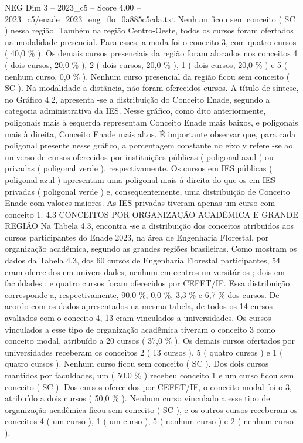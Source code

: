 \begin{textsample}{NEG Dim 3 – 2023\_c5 – Score 4.00 – 2023\_c5/enade\_2023\_eng\_flo\_0a885c5cda.txt}
Nenhum ficou sem conceito ( SC ) nessa região.
Também na região Centro-Oeste, todos os cursos foram ofertados na modalidade presencial.
Para esses, a moda foi o conceito 3, com quatro cursos ( 40,0 \% ).
Os demais cursos presenciais da região foram alocados nos conceitos 4 ( dois cursos, 20,0 \% ), 2 ( dois cursos, 20,0 \% ), 1 ( dois cursos, 20,0 \% ) e 5 ( nenhum curso, 0,0 \% ).
Nenhum curso presencial da região ficou sem conceito ( SC ).
Na modalidade a distância, não foram oferecidos cursos.
A título de síntese, no Gráfico 4.2, apresenta -se a distribuição do Conceito Enade, segundo a categoria administrativa da IES.
Nesse gráfico, como dito anteriormente, poligonais mais à esquerda representam Conceito Enade mais baixos, e poligonais mais à direita, Conceito Enade mais altos.
É importante observar que, para cada poligonal presente nesse gráfico, a porcentagem constante no eixo y refere -se ao universo de cursos oferecidos por instituições públicas ( poligonal azul ) ou privadas ( poligonal verde ), respectivamente.
Os cursos em IES públicas ( poligonal azul ) apresentam uma poligonal mais à direita do que os em IES privadas ( poligonal verde ) e, consequentemente, uma distribuição de Conceito Enade com valores maiores.
As IES privadas tiveram apenas um curso com conceito 1. 4.3 CONCEITOS POR ORGANIZAÇÃO ACADÊMICA E GRANDE REGIÃO Na Tabela 4.3, encontra -se a distribuição dos conceitos atribuídos aos cursos participantes do Enade 2023, na área de Engenharia Florestal, por organização acadêmica, segundo as grandes regiões brasileiras.
Como mostram os dados da Tabela 4.3, dos 60 cursos de Engenharia Florestal participantes, 54 eram oferecidos em universidades, nenhum em centros universitários ; dois em faculdades ; e quatro cursos foram oferecidos por CEFET/IF.
Essa distribuição corresponde a, respectivamente, 90,0 \%, 0,0 \%, 3,3 \% e 6,7 \% dos cursos.
De acordo com os dados apresentados na mesma tabela, de todos os 14 cursos avaliados com o conceito 4, 13 eram vinculados a universidades.
Os cursos vinculados a esse tipo de organização acadêmica tiveram o conceito 3 como conceito modal, atribuído a 20 cursos ( 37,0 \% ).
Os demais cursos ofertados por universidades receberam os conceitos 2 ( 13 cursos ), 5 ( quatro cursos ) e 1 ( quatro cursos ).
Nenhum curso ficou sem conceito ( SC ).
Dos dois cursos mantidos por faculdades, um ( 50,0 \% ) recebeu conceito 1 e um curso ficou sem conceito ( SC ).
Dos cursos oferecidos por CEFET/IF, o conceito modal foi o 3, atribuído a dois cursos ( 50,0 \% ).
Nenhum curso vinculado a esse tipo de organização acadêmica ficou sem conceito ( SC ), e os outros cursos receberam os conceitos 4 ( um curso ), 1 ( um curso ), 5 ( nenhum curso ) e 2 ( nenhum curso ).

\end{textsample}
